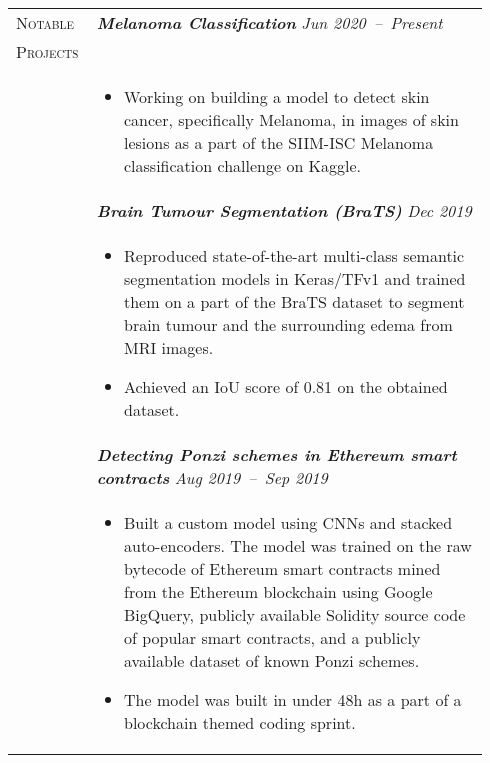 \documentclass[letterpaper, 10pt, oneside]{article}
\newcommand{\stitle}[1]{\normalsize{\textsc{#1}}}
\newcommand{\bdit}[1]{\textit{\textbf{#1}}}
\begin{document}
\begin{longtable}{@{} p{0.14\linewidth} p{0.8\linewidth}}
\newpage
\stitle{Notable}  & \bdit{Melanoma Classification} \hfill \textit{Jun 2020\ --\ Present} \\
\stitle{Projects} & \\
                  & \parbox{0.8\textwidth}{
                        \begin{itemize}[leftmargin=*, itemsep=-0.88ex, topsep=-0.1ex]
                            \item Working on building a model to detect skin cancer, specifically Melanoma, in images of skin lesions
                                  as a part of the SIIM-ISC Melanoma classification challenge on Kaggle. 
                        \end{itemize}
                    }

\\
                  & \bdit{Brain Tumour Segmentation (BraTS)} \hfill \textit{Dec 2019} \\
                  & \parbox{0.8\textwidth}{
                        \begin{itemize}[leftmargin=*, itemsep=-0.88ex]
                            \item Reproduced state-of-the-art multi-class semantic segmentation models in Keras/TFv1 and trained them on a part of the
                                  BraTS dataset to segment brain tumour and the surrounding edema from MRI images.
                            \item Achieved an IoU score of 0.81 on the obtained dataset.
                        \end{itemize}
                    }  
\\
                  & \bdit{Detecting Ponzi schemes in Ethereum smart contracts} \hfill \textit{Aug 2019\ --\ Sep 2019} \\
                  & \parbox{0.8\textwidth}{
                        \begin{itemize}[leftmargin=*, itemsep=-0.88ex]
                            \item Built a custom model using CNNs and stacked auto-encoders. 
                                  The model was trained on the raw bytecode of Ethereum smart contracts mined from the Ethereum blockchain 
                                  using Google BigQuery, publicly available Solidity source code of popular smart contracts, 
                                  and a publicly available dataset of known Ponzi schemes.
                            \item The model was built in under 48h as a part of a blockchain themed coding sprint.

\end{itemize}}
\end{longtable}
\end{document}
